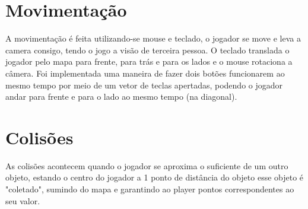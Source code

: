 \documentclass[12pt]{article}
\begin{document}
\section{Movimentação}

A movimentação é feita utilizando-se mouse e teclado, o jogador se move e leva a camera consigo, tendo o jogo a visão de terceira pessoa. O teclado translada o jogador pelo mapa para frente, para trás e para os lados e o mouse rotaciona a câmera. Foi implementada uma maneira de fazer dois botões funcionarem ao mesmo tempo por meio de um vetor de teclas apertadas, podendo o jogador andar para frente e para o lado ao mesmo tempo (na diagonal).

\section{Colisões}

As colisões acontecem quando o jogador se aproxima o suficiente de um outro objeto, estando o centro do jogador a 1 ponto de distância do objeto esse objeto é "coletado", sumindo do mapa e garantindo ao player pontos correspondentes ao seu valor.
\end{document}
